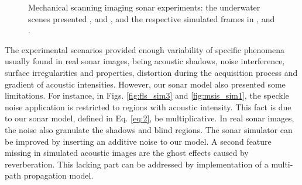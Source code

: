 \documentclass[final,5p,times]{elsarticle}
\begin{document}
\begin{figure}[!ht]
{        \label{fig:msis_sim2}
    }
    \captionsetup{justification=centering}
    \caption{Mechanical scanning imaging sonar experiments: the underwater scenes presented ,  and , and the respective simulated frames in ,  and .}
    \label{fig:msis}
\end{figure}

The experimental scenarios provided enough variability of specific phenomena usually found in real sonar images, being acoustic shadows, noise interference, surface irregularities and properties, distortion during the acquisition process and gradient of acoustic intensities. However, our sonar model also presented some limitations. For instance, in Figs. \ref{fig:fls_sim3} and \ref{fig:msis_sim1}, the speckle noise application is restricted to regions with acoustic intensity. This fact is due to our sonar model, defined in Eq. \ref{eq:2}, be multiplicative. In real sonar images, the noise also granulate the shadows and blind regions. The sonar simulator can be improved by inserting an additive noise to our model. A second feature missing in simulated acoustic images are the ghost effects caused by reverberation. This lacking part can be addressed by implementation of a multi-path propagation model.
\end{document}
